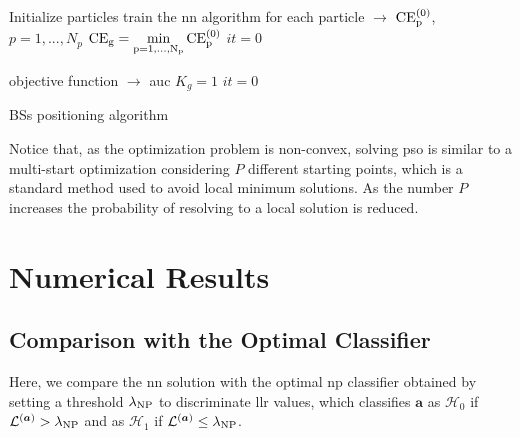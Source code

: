 \documentclass[conference]{IEEEtran}
\begin{document}
 \begin{algorithm}[t]


  Initialize particles\;
  train the \ac{nn} algorithm for each particle $\to$ $\rm{CE}_p^{(0)}$, $p=1,...,N_p$\;
  $\rm{CE}_g=\underset{p=1,...,N_p}{min} \, \rm{CE}_p^{(0)}$\;
  $it = 0$\;

      
      objective function $\to$ \ac{auc}\;
      $K_g = 1$\;
      $it = 0$\;
    
\caption{BSs positioning algorithm}
 \end{algorithm}

Notice that, as the optimization problem is non-convex, solving \ac{pso} is similar to a multi-start optimization considering $P$ different starting points, which is a standard method used to avoid local minimum solutions. As the number $P$ increases the probability of resolving to a local solution is reduced.

\section{Numerical Results}\label{sec: nr}
\subsection{Comparison with the Optimal Classifier}
Here, we compare the \ac{nn} solution with the optimal \ac{np} classifier obtained by setting a threshold $\lambda_{\rm NP}$ to discriminate \ac{llr} values, which classifies $\bm{a}$ as $\mathcal{H}_0$ if $\mathcal{L}^{(\bm{a})} > \lambda_{\rm NP}$ and as $\mathcal{H}_1$ if $\mathcal{L}^{(\bm{a})} \le \lambda_{\rm NP}$.
\end{document}
